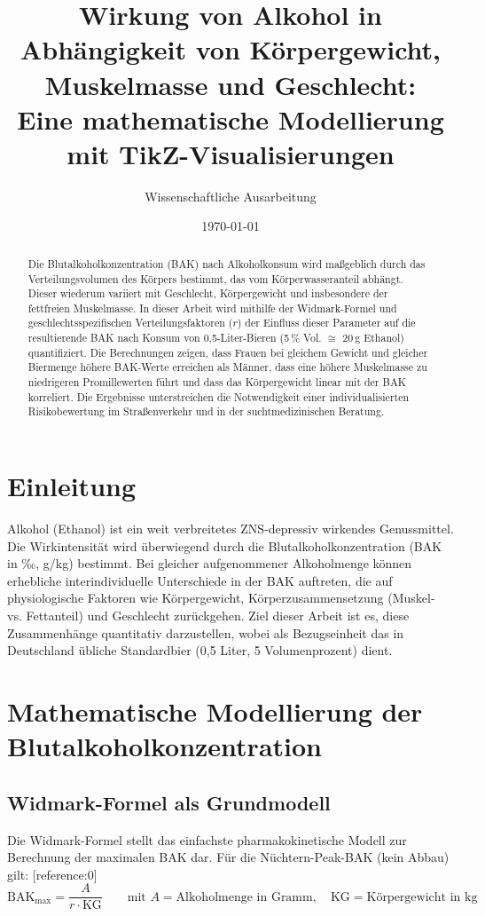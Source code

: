 \documentclass[11pt,a4paper]{article}
\title{Wirkung von Alkohol in Abhängigkeit von Körpergewicht, Muskelmasse und Geschlecht: \\
	\large Eine mathematische Modellierung mit TikZ-Visualisierungen}
\author{Wissenschaftliche Ausarbeitung}
\date{\today}
\begin{document}
	
	\maketitle
	
	\begin{abstract}
		Die Blutalkoholkonzentration (BAK) nach Alkoholkonsum wird maßgeblich durch das Verteilungsvolumen des Körpers bestimmt, das vom Körperwasseranteil abhängt. Dieser wiederum variiert mit Geschlecht, Körpergewicht und insbesondere der fettfreien Muskelmasse. In dieser Arbeit wird mithilfe der Widmark-Formel und geschlechtsspezifischen Verteilungsfaktoren ($r$) der Einfluss dieser Parameter auf die resultierende BAK nach Konsum von 0,5-Liter-Bieren (5\,\% Vol. $\cong$ 20\,g Ethanol) quantifiziert. Die Berechnungen zeigen, dass Frauen bei gleichem Gewicht und gleicher Biermenge höhere BAK-Werte erreichen als Männer, dass eine höhere Muskelmasse zu niedrigeren Promillewerten führt und dass das Körpergewicht linear mit der BAK korreliert. Die Ergebnisse unterstreichen die Notwendigkeit einer individualisierten Risikobewertung im Straßenverkehr und in der suchtmedizinischen Beratung.
	\end{abstract}
	
	\section{Einleitung}
	Alkohol (Ethanol) ist ein weit verbreitetes ZNS-depressiv wirkendes Genussmittel. Die Wirkintensität wird überwiegend durch die Blutalkoholkonzentration (BAK in ‰, g/kg) bestimmt. Bei gleicher aufgenommener Alkoholmenge können erhebliche interindividuelle Unterschiede in der BAK auftreten, die auf physiologische Faktoren wie Körpergewicht, Körperzusammensetzung (Muskel- vs. Fettanteil) und Geschlecht zurückgehen. Ziel dieser Arbeit ist es, diese Zusammenhänge quantitativ darzustellen, wobei als Bezugseinheit das in Deutschland übliche Standardbier (0,5 Liter, 5 Volumenprozent) dient.
	
	\section{Mathematische Modellierung der Blutalkoholkonzentration}
	
	\subsection{Widmark-Formel als Grundmodell}
	Die Widmark-Formel stellt das einfachste pharmakokinetische Modell zur Berechnung der maximalen BAK dar. Für die Nüchtern-Peak-BAK (kein Abbau) gilt: [reference:0]
	\[
	\text{BAK}_{\text{max}} = \frac{A}{r \cdot \text{KG}} \qquad \text{mit } A = \text{Alkoholmenge in Gramm}, \quad \text{KG} = \text{Körpergewicht in kg}
	\]
	
\end{document}
